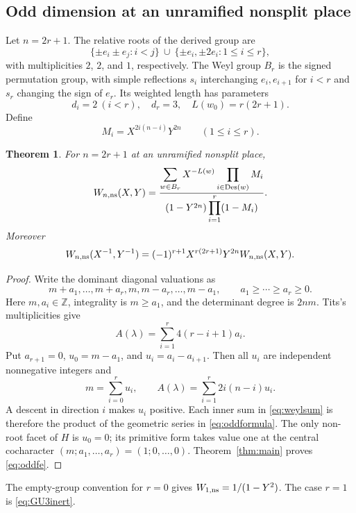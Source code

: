 \documentclass[11pt,a4paper]{article}
\newtheorem{theorem}{Theorem}
\theoremstyle{definition}
\newcommand{\Z}{\mathbb Z}
\newcommand{\Des}{\operatorname{Des}}
\begin{document}
\subsection{Odd dimension at an unramified nonsplit place}
Let $n=2r+1$. The relative roots of the derived group are
\[
 \{\pm e_i\pm e_j:i<j\}\ \cup\ \{\pm e_i,\pm2e_i:1\leq i\leq r\},
\]
with multiplicities $2$, $2$, and $1$, respectively. The Weyl group
$B_r$ is the signed permutation group, with simple reflections
$s_i$ interchanging $e_i,e_{i+1}$ for $i<r$ and $s_r$ changing the
sign of $e_r$. Its weighted length has parameters
\[
 d_i=2\ (i<r),\quad d_r=3,\quad L(w_0)=r(2r+1).
\]
Define
\begin{equation}\label{eq:oddMi}
 M_i=X^{2i(n-i)}Y^{2n}\qquad(1\leq i\leq r).
\end{equation}
\begin{theorem}\label{thm:odd}
For $n=2r+1$ at an unramified nonsplit place,
\begin{equation}\label{eq:oddformula}
 W_{n,\rm ns}(X,Y)=
 \frac{\displaystyle\sum_{w\in B_r}X^{-L(w)}
                         \prod_{i\in\Des(w)}M_i}
 {(1-Y^{2n})\displaystyle\prod_{i=1}^r(1-M_i)}.
\end{equation}
Moreover
\begin{equation}\label{eq:oddfe}
 W_{n,\rm ns}(X^{-1},Y^{-1})
 =(-1)^{r+1}X^{r(2r+1)}Y^{2n}W_{n,\rm ns}(X,Y).
\end{equation}
\end{theorem}
\begin{proof}
Write the dominant diagonal valuations as
\[
 m+a_1,\ldots,m+a_r,m,m-a_r,\ldots,m-a_1,
 \qquad a_1\geq\cdots\geq a_r\geq0.
\]
Here $m,a_i\in\Z$, integrality is $m\geq a_1$, and the determinant
degree is $2nm$. Tits's multiplicities give
\[
 A(\lambda)=\sum_{i=1}^r4(r-i+1)a_i.
\]
Put $a_{r+1}=0$, $u_0=m-a_1$, and $u_i=a_i-a_{i+1}$.
Then all $u_i$ are independent nonnegative integers and
\[
 m=\sum_{i=0}^ru_i,\qquad
 A(\lambda)=\sum_{i=1}^r2i(n-i)u_i.
\]
A descent in direction $i$ makes $u_i$ positive. Each inner sum
in \eqref{eq:weylsum} is therefore the product of the geometric
series in \eqref{eq:oddformula}. The only non-root facet of $H$
is $u_0=0$; its primitive form takes value one at the central
cocharacter $(m;a_1,\ldots,a_r)=(1;0,\ldots,0)$.
Theorem~\ref{thm:main} proves \eqref{eq:oddfe}.
\end{proof}
The empty-group convention for $r=0$ gives $W_{1,\rm ns}=1/(1-Y^2)$.
The case $r=1$ is \eqref{eq:GU3inert}.
\end{document}

